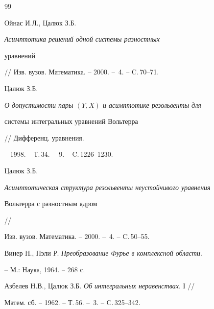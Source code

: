 \begin{thebibliography}{99}


Ойнас И.Л., Цалюк З.Б. {\em Асимптотика решений одной системы разностных


уравнений} // Изв. вузов. Математика. -- 2000. -- \No\,4. --  C.\,70--71. 




Цалюк З.Б. {\em О допустимости пары $(Y,X)$ и асимптотике резольвенты для 


системы интегральных уравнений Вольтерра} // Дифференц. уравнения.


-- 1998. -- Т.\,34. -- \No\,9. -- C.\,1226--1230. 




Цалюк З.Б. {\em Асимптотическая структура резольвенты неустойчивого уравнения


Вольтерра с разностным ядром} //


Изв. вузов. Математика. -- 2000. -- \No\,4. -- C.\,50--55. 




Винер Н., Пэли Р. {\em Преобразование Фурье в комплексной области}.


-- М.: Наука, 1964. -- 268 с. 




Азбелев Н.В., Цалюк З.Б. {\em Об интегральных неравенствах}. I //


Матем. сб. -- 1962. -- Т.\,56. -- \No\,3. -- C.\,325--342. 





\end{thebibliography}





\vskip 2cm












\label{end}






